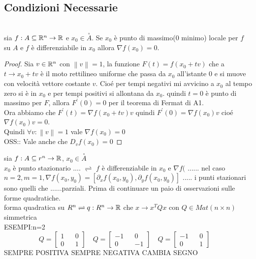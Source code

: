 \subsection{Condizioni Necessarie}
\\
sia $f:A\subseteq \mathbb{R}^n\rightarrow \mathbb{R}$ e $x_0\in\overset{\circ}A$. Se $x_0$ è punto di massimo(0 minimo) locale per $f$ su $A$ e $f$ è differenziabile in $x_0$ allora $\nabla f(x_0)=0$.
\begin{proof}
	Sia $v\in \mathbb{R}^n$ con $\left\| v\right\| =1$, la funzione $F(t)= f(x_0+tv)$ che a $t\rightarrow x_0+tv$ è il moto rettilineo uniforme che passa da $x_0$ all'istante $0$ e si muove con velocità vettore costante $v$. Cio\'e per tempi negativi mi avvicino a $x_0$ al tempo zero si è in $x_0$ e per tempi positivi si allontana da $x_0$. quindi $t=0$ è punto di massimo per $F$, allora $F^{'}(0) = 0$ per il teorema di Fermat di A1.\\
	Ora abbiamo che $F^{'}(t)=\nabla f(x_0+tv)v$ quindi $F^{'}(0)=\nabla f(x_0)v$ cio\'e $\nabla f(x_0)v=0$.\\
	Quindi $\forall v :\left\| v\right\| =1$ vale $\nabla f(x_0)=0$\\
	OSS:: Vale anche che $D_vf(x_0)=0$
\end{proof}
sia $f:A\subseteq r^n\rightarrow \mathbb{R}$, $x_0\in\overset{\circ}{A}$\\
$x_0$ è punto stazionario .... $\rightleftharpoons$ $f$ è differenziabile in $x_0$ e $\nabla f($ ......
\observation
nel caso $n=2, m=1, \nabla f(x_0,y_0)=[\partial_xf(x_0,y_0), \partial_yf(x_0,y_0)]$ ..... i punti stazionari sono quelli che ......parziali.
\observation
Prima di continuare un paio di osservazioni sulle forme quadratiche.\\
forma quadratica su $R^n \rightleftharpoons q:R^n\rightarrow \mathbb{R}$ che $x\rightarrow x^TQx$ con $Q\in Mat(n\times n)$ simmetrica\\
ESEMPI:n=2\\
$$
Q=\begin{bmatrix}1&&0\\0&&1\end{bmatrix}\quad
Q=\begin{bmatrix}-1&&0\\0&&-1\end{bmatrix}\quad
Q=\begin{bmatrix}-1&&0\\0&&1\end{bmatrix}\quad 
$$
SEMPRE POSITIVA SEMPRE NEGATIVA CAMBIA SEGNO\\
